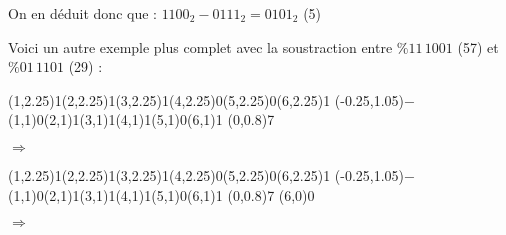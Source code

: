 \documentclass[11pt,a4paper]{article}
\begin{document}
\vspace*{-0.5cm}

On en déduit donc que : $ 1100_{2} - 0111_{2} = 0101_{2} $ (5)

\medskip


\bigskip

Voici un autre exemple plus complet avec la soustraction entre $ \% 11 \, 1001 $ (57) et $ \% 01 \, 1101 $ (29) :

\begin{center}

\begin{table}[ht!]
  \centering
  \begin{minipage}{0.15\textwidth}

\par\vspace{3\oplineheight}
\oplput(1,2.25){1}\oplput(2,2.25){1}\oplput(3,2.25){1}\oplput(4,2.25){0}\oplput(5,2.25){0}\oplput(6,2.25){1}
\oplput(-0.25,1.05){$-$}
\oplput(1,1){0}\oplput(2,1){1}\oplput(3,1){1}\oplput(4,1){1}\oplput(5,1){0}\oplput(6,1){1}
\ophline(0,0.8){7}

  \end{minipage}
  \hfillx
  \begin{minipage}{0.1\textwidth}
  \centering

$ \Rightarrow $

  \end{minipage}
  \hfillx
  \begin{minipage}{0.15\textwidth}

\par\vspace{3\oplineheight}
\oplput(1,2.25){1}\oplput(2,2.25){1}\oplput(3,2.25){1}\oplput(4,2.25){0}\oplput(5,2.25){0}\oplput(6,2.25){1}
\oplput(-0.25,1.05){$-$}
\oplput(1,1){0}\oplput(2,1){1}\oplput(3,1){1}\oplput(4,1){1}\oplput(5,1){0}\oplput(6,1){1}
\ophline(0,0.8){7}
\oplput(6,0){0}

  \end{minipage}
  \hfillx
  \begin{minipage}{0.1\textwidth}
  \centering

$ \Rightarrow $

  \end{minipage}
  \hfillx
  \begin{minipage}{0.15\textwidth}


\end{minipage}
\end{table}
\end{center}
\end{document}
